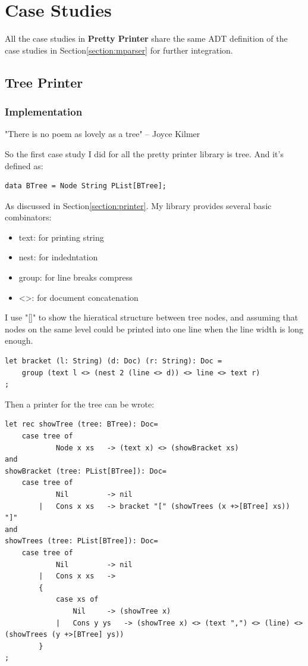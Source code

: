 \section{Case Studies}

All the case studies in \textbf{Pretty Printer} share the same ADT definition of the case studies in Section\ref{section:mparser} for further integration.

\subsection{Tree Printer}

\subsubsection{Implementation}
"There is no poem as lovely as a tree" -- Joyce Kilmer

So the first case study I did for all the pretty printer library is tree. And it's defined as:

\begin{lstlisting}
data BTree = Node String PList[BTree];
\end{lstlisting}

As discussed in Section\ref{section:printer}. My library provides several basic combinators:
\begin{itemize}
\item text:    for printing string
\item nest:    for indedntation
\item group:   for line breaks compress
\item <>:      for document concatenation
\end{itemize}
I use "[]" to show the hieratical structure between tree nodes, and assuming that nodes on the same level could be printed into one line when the line width is long enough.
\begin{lstlisting}
let bracket (l: String) (d: Doc) (r: String): Doc =
    group (text l <> (nest 2 (line <> d)) <> line <> text r)
;
\end{lstlisting}
Then a printer for the tree can be wrote:
\begin{lstlisting}
let rec showTree (tree: BTree): Doc=
    case tree of
            Node x xs   -> (text x) <> (showBracket xs)
and
showBracket (tree: PList[BTree]): Doc=
    case tree of
            Nil         -> nil
        |   Cons x xs   -> bracket "[" (showTrees (x +>[BTree] xs)) "]"
and
showTrees (tree: PList[BTree]): Doc=
    case tree of
            Nil         -> nil
        |   Cons x xs   ->
        {
            case xs of
                Nil     -> (showTree x)
            |   Cons y ys   -> (showTree x) <> (text ",") <> (line) <> (showTrees (y +>[BTree] ys))
        }
;
\end{lstlisting}

